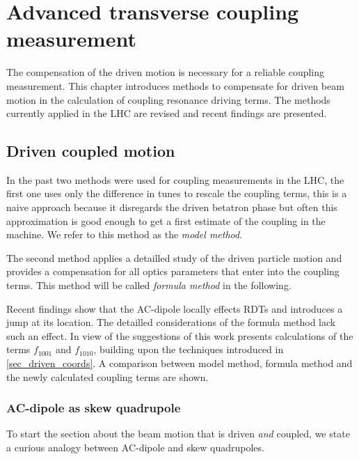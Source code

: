 \chapter{Advanced transverse coupling measurement} 
 \label{sec_coupling}

\begin{chapterinfo}
    The compensation of the driven motion is necessary for a reliable coupling measurement.
    This chapter introduces methods to compensate for driven beam motion in the calculation of
    coupling resonance driving terms. The methods currently applied in the LHC are revised and
    recent findings are presented.
\end{chapterinfo}

\section{Driven coupled motion}
 In the past two methods were used for coupling measurements in
the LHC, the first one uses only the difference in tunes to rescale the coupling terms, this is
a naive approach because it disregards the driven betatron phase but often this approximation is
good enough to get a first estimate of the coupling in the machine. We refer to this method as the
\emph{model method}.

The second method \cite{Miyamoto2010} applies a detailled study of the driven particle motion and
provides a compensation for all optics parameters that enter into the coupling terms. This method will
be called \emph{formula method} in the following.

Recent findings \cite{Carlier2020} show that the AC-dipole locally effects RDTs and introduces
a jump at its location. The detailled considerations of the formula method lack such an effect.
In view of the suggestions of \cite{Carlier2020} this work presents calculations of the terms
$f_{1001}$ and $f_{1010}$, building upon the techniques introduced in \ref{sec_driven_coords}.
A comparison between model method, formula method and the newly calculated coupling terms are shown.


\subsection{AC-dipole as skew quadrupole}

To start the section about the beam motion that is driven \emph{and} coupled, we state a curious
analogy between AC-dipole and skew quadrupoles.

